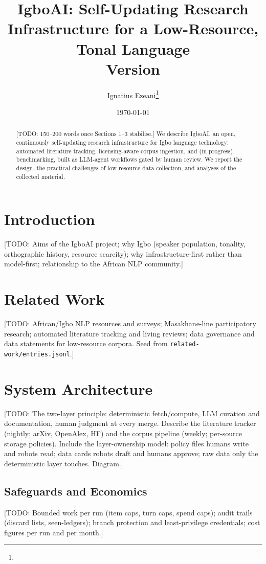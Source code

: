 \documentclass[11pt]{article}
\title{IgboAI: Self-Updating Research Infrastructure for a Low-Resource, Tonal Language\\[0.4em]\large Version \paperversion}
\author{Ignatius Ezeani\thanks{\todo{affiliation, email, ORCID; add co-authors as they join}}}
\date{\today}
\newcommand{\todo}[1]{\textcolor{red!70!black}{[TODO: #1]}}
\begin{document}
\maketitle

\begin{abstract}
\todo{150--200 words once Sections 1--3 stabilise.}
We describe IgboAI, an open, continuously self-updating research infrastructure for Igbo language technology: automated literature tracking,
licensing-aware corpus ingestion, and (in progress) benchmarking, built as LLM-agent workflows gated by human review. We report the design, the
practical challenges of low-resource data collection, and analyses of the collected material.
\end{abstract}

\section{Introduction}
\todo{Aims of the IgboAI project; why Igbo (speaker population, tonality, orthographic history, resource scarcity); why infrastructure-first rather
than model-first; relationship to the African NLP community.}

\section{Related Work}
\todo{African/Igbo NLP resources and surveys; Masakhane-line participatory research; automated literature tracking and living reviews; data governance
and data statements for low-resource corpora. Seed from \texttt{related-work/entries.jsonl}.}

\section{System Architecture}
\label{sec:architecture}
\todo{The two-layer principle: deterministic fetch/compute, LLM curation and documentation, human judgment at every merge. Describe the literature
tracker (nightly; arXiv, OpenAlex, HF) and the corpus pipeline (weekly; per-source storage policies). Include the layer-ownership model: policy
files humans write and robots read; data cards robots draft and humans approve; raw data only the deterministic layer touches. Diagram.}

\subsection{Safeguards and Economics}
\todo{Bounded work per run (item caps, turn caps, spend caps); audit trails (discard lists, seen-ledgers); branch protection and least-privilege
credentials; cost figures per run and per month.}
\end{document}
